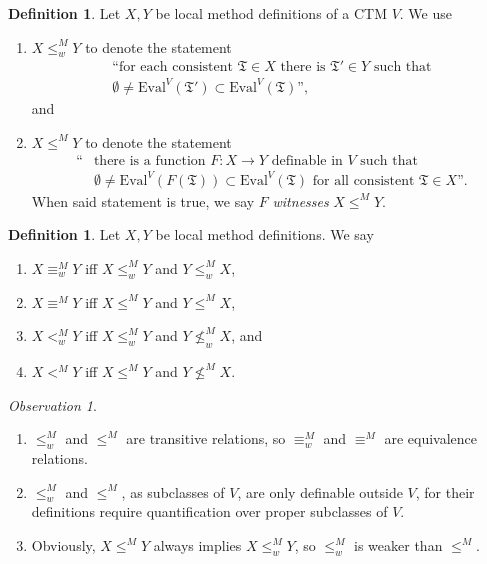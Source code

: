 \documentclass[12pt, twoside]{memoir}
\numberwithin{equation}{section}
\theoremstyle{definition}
\newtheorem{defi}[thm]{Definition}
\theoremstyle{remark}
\newtheorem{ob}[thm]{Observation}
\theoremstyle{definition}
\theoremstyle{definition}
\theoremstyle{definition}
\theoremstyle{remark}
\begin{document}
\begin{defi}\label{def9210}
Let $X, Y$ be local method definitions of a CTM $V$. We use 
\begin{enumerate}[label=(\arabic*)]
    \item $X \leq^M_w Y$ to denote the statement
    \begin{gather*}
        \text{``for each consistent } \mathfrak{T} \in X \text{ there is } \mathfrak{T}' \in Y \text{ such that} \\
        \emptyset \neq \mathrm{Eval}^V(\mathfrak{T}') \subset \mathrm{Eval}^V(\mathfrak{T}) \text{'',}
    \end{gather*}
    and
    \item $X \leq^M Y$ to denote the statement
    \begin{align*}
        \text{``} & \text{there is a function } F : X \longrightarrow Y \text{ definable in } V \text{ such that} \\ 
        & \emptyset \neq \mathrm{Eval}^V(F(\mathfrak{T})) \subset \mathrm{Eval}^V(\mathfrak{T}) \text{ for all consistent } \mathfrak{T} \in X \text{''.}
    \end{align*}
    When said statement is true, we say $F$ \emph{witnesses} $X \leq^M Y$.
\end{enumerate}
\end{defi}

\begin{defi}
Let $X, Y$ be local method definitions. We say
\begin{enumerate}[label=(\arabic*)]
    \item $X \equiv^M_w Y$ iff $X \leq^M_w Y$ and $Y \leq^M_w X$,
    \item $X \equiv^M Y$ iff $X \leq^M Y$ and $Y \leq^M X$,
    \item $X <^M_w Y$ iff $X \leq^M_w Y$ and $Y \not\leq^M_w X$, and
    \item $X <^M Y$ iff $X \leq^M Y$ and $Y \not\leq^M X$.
\end{enumerate}
\end{defi}

\begin{ob}
\leavevmode
\begin{enumerate}[label=(\arabic*)]
    \item $\leq^M_w$ and $\leq^M$ are transitive relations, so $\equiv^M_w$ and $\equiv^M$ are equivalence relations.
    \item $\leq^M_w$ and $\leq^M$, as subclasses of $V$, are only definable outside $V$, for their definitions require quantification over proper subclasses of $V$. 
    \item Obviously, $X \leq^M Y$ always implies $X \leq^M_w Y$, so $\leq^M_w$ is weaker than $\leq^M$. 
\end{enumerate}
\end{ob}
\end{document}
